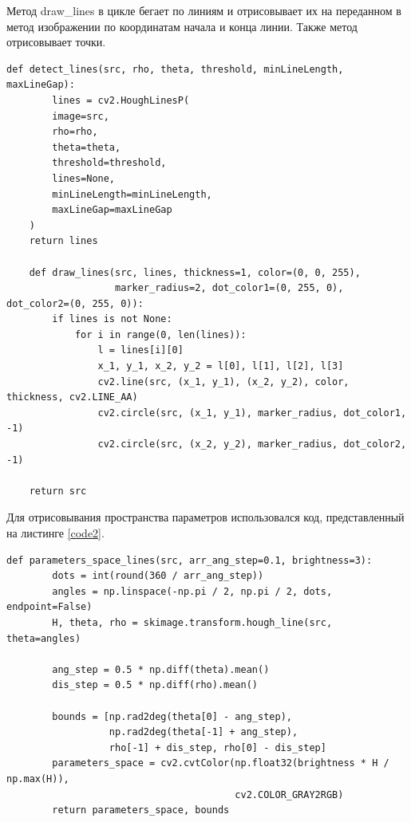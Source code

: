 \documentclass[a4paper, 16pt]{article}
\begin{document}
    \noindent Метод draw\_{lines} в цикле бегает по линиям и отрисовывает их на переданном в метод изображении по
    координатам начала и конца линии. Также метод отрисовывает точки.
    \begin{lstlisting}[label=code1, caption={Алгоритм Хафа для поиска линий и отрисовки их на изображении.}]
    def detect_lines(src, rho, theta, threshold, minLineLength, maxLineGap):
        lines = cv2.HoughLinesP(
        image=src,
        rho=rho,
        theta=theta,
        threshold=threshold,
        lines=None,
        minLineLength=minLineLength,
        maxLineGap=maxLineGap
    )
    return lines

    def draw_lines(src, lines, thickness=1, color=(0, 0, 255),
                   marker_radius=2, dot_color1=(0, 255, 0), dot_color2=(0, 255, 0)):
        if lines is not None:
            for i in range(0, len(lines)):
                l = lines[i][0]
                x_1, y_1, x_2, y_2 = l[0], l[1], l[2], l[3]
                cv2.line(src, (x_1, y_1), (x_2, y_2), color, thickness, cv2.LINE_AA)
                cv2.circle(src, (x_1, y_1), marker_radius, dot_color1, -1)
                cv2.circle(src, (x_2, y_2), marker_radius, dot_color2, -1)

    return src
    \end{lstlisting}


    \noindent Для отрисовывания пространства параметров использовался код, представленный на листинге \ref{code2}.
    \begin{lstlisting}[label=code2, caption={Программа для отрисовки пространства параметров для линий.}]
    def parameters_space_lines(src, arr_ang_step=0.1, brightness=3):
        dots = int(round(360 / arr_ang_step))
        angles = np.linspace(-np.pi / 2, np.pi / 2, dots, endpoint=False)
        H, theta, rho = skimage.transform.hough_line(src, theta=angles)

        ang_step = 0.5 * np.diff(theta).mean()
        dis_step = 0.5 * np.diff(rho).mean()

        bounds = [np.rad2deg(theta[0] - ang_step),
                  np.rad2deg(theta[-1] + ang_step),
                  rho[-1] + dis_step, rho[0] - dis_step]
        parameters_space = cv2.cvtColor(np.float32(brightness * H / np.max(H)),
                                        cv2.COLOR_GRAY2RGB)
        return parameters_space, bounds
    \end{lstlisting}
\end{document}
